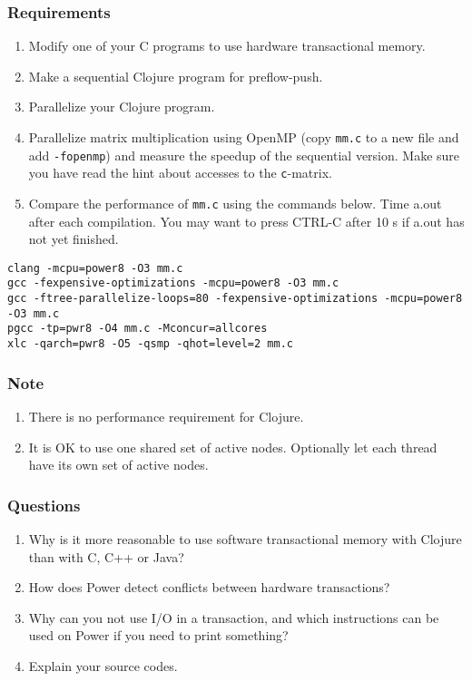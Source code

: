 \documentclass{forsete}
\begin{document}
\subsubsection*{Requirements}
\begin{enumerate}
\item Modify one of your C programs to use hardware transactional memory.
\item Make a sequential Clojure program for preflow-push.
\item Parallelize your Clojure program.
\item Parallelize matrix multiplication using OpenMP (copy \verb!mm.c! to a new file and add \verb.-fopenmp.) 
and measure the speedup of the sequential version.  Make sure you have read the hint about accesses to the \verb.c.-matrix.
\item Compare the performance of \verb!mm.c! using the commands below.
Time a.out after each compilation. You may want to press CTRL-C after 10 s if
a.out has not yet finished.
\end{enumerate}
\begin{verbatim} 
clang -mcpu=power8 -O3 mm.c
gcc -fexpensive-optimizations -mcpu=power8 -O3 mm.c
gcc -ftree-parallelize-loops=80 -fexpensive-optimizations -mcpu=power8 -O3 mm.c
pgcc -tp=pwr8 -O4 mm.c -Mconcur=allcores
xlc -qarch=pwr8 -O5 -qsmp -qhot=level=2 mm.c
\end{verbatim}

\subsubsection*{Note}
\begin{enumerate}
\item There is no performance requirement for Clojure.
\item It is OK to use one shared set of active nodes. Optionally let each thread have
its own set of active nodes.
\end{enumerate}

\subsubsection*{Questions}
\begin{enumerate}
\item Why is it more reasonable to use software transactional memory with
Clojure than with C, C++ or Java?
\item How does Power detect conflicts between hardware transactions?
\item Why can you not use I/O in a transaction, and which instructions can be used on Power if
you need to print something?
\item Explain your source codes.
\end{enumerate}
\end{document}
